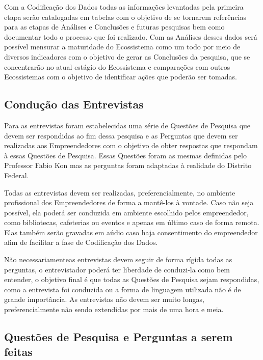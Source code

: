 Com a Codificação dos Dados todas as informações levantadas pela primeira etapa serão catalogadas em tabelas com o objetivo de se tornarem referências para as etapas de Análises e Conclusões e
futuras pesquisas bem como documentar todo o processo que foi realizado. Com as Análises desses dados será possível mensurar a maturidade do Ecossistema como um todo por meio de diversos indicadores
com o objetivo de gerar as Conclusões da pesquisa, que se concentrarão no atual estágio do Ecossistema e comparações com outros Ecossistemas com o objetivo de identificar ações que poderão ser tomadas.

\subsection{Condução das Entrevistas}
\label{subsection:conducao_das_entrevistas}

Para as entrevistas foram estabelecidas uma série de Questões de Pesquisa que devem ser respondidas ao fim dessa pesquisa e as Perguntas que devem ser realizadas aos Empreendedores com o objetivo de
obter respostas que respondam à essas Questões de Pesquisa. Essas Questões foram as mesmas definidas pelo Professor Fabio Kon mas as perguntas foram adaptadas à realidade do Distrito Federal.

Todas as entrevistas devem ser realizadas, preferencialmente, no ambiente profissional dos Empreendedores de forma a mantê-los à vontade. Caso não seja possível, ela poderá ser conduzida em ambiente
escolhido pelos empreendedor, como bibliotecas, cafeterias ou eventos e apenas em último caso de forma remota. Elas também serão gravadas em aúdio caso haja consentimento do empreendedor afim de
facilitar a fase de Codificação dos Dados.

Não necessariamenteas entrevistas devem seguir de forma rígida todas as perguntas, o entrevistador poderá ter liberdade de conduzi-la como bem entender, o objetivo final é que todas as Questões de Pesquisa
sejam respondidas, como a entrevista foi conduzida ou a forma de linguagem utilizada não é de grande importância. As entrevistas não devem ser muito longas, preferencialmente não sendo extendidas por mais
de uma hora e meia.

\subsection{Questões de Pesquisa e Perguntas a serem feitas}
\label{subsection:questoes_de_pesquisa_e_perguntas}

